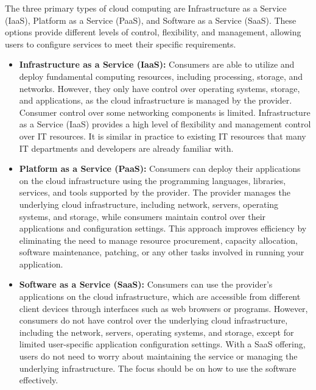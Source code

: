 The three primary types of cloud computing are Infrastructure as a Service (IaaS), Platform as a Service (PaaS), and Software as a Service (SaaS). These options provide different levels of control, flexibility, and management, allowing users to configure services to meet their specific requirements.
\begin{itemize}
    \item \textbf{Infrastructure as a Service (IaaS): } Consumers are able to utilize and deploy fundamental computing resources, including processing, storage, and networks. However, they only have control over operating systems, storage, and applications, as the cloud infrastructure is managed by the provider. Consumer control over some networking components is limited. Infrastructure as a Service (IaaS) provides a high level of flexibility and management control over IT resources. It is similar in practice to existing IT resources that many IT departments and developers are already familiar with. 
    \item \textbf{Platform as a Service (PaaS): } Consumers can deploy their applications on the cloud infrastructure using the programming languages, libraries, services, and tools supported by the provider. The provider manages the underlying cloud infrastructure, including network, servers, operating systems, and storage, while consumers maintain control over their applications and configuration settings. This approach improves efficiency by eliminating the need to manage resource procurement, capacity allocation, software maintenance, patching, or any other tasks involved in running your application. 
    \item \textbf{Software as a Service (SaaS): } Consumers can use the provider's applications on the cloud infrastructure, which are accessible from different client devices through interfaces such as web browsers or programs. However, consumers do not have control over the underlying cloud infrastructure, including the network, servers, operating systems, and storage, except for limited user-specific application configuration settings. With a SaaS offering, users do not need to worry about maintaining the service or managing the underlying infrastructure. The focus should be on how to use the software effectively.
\end{itemize}

